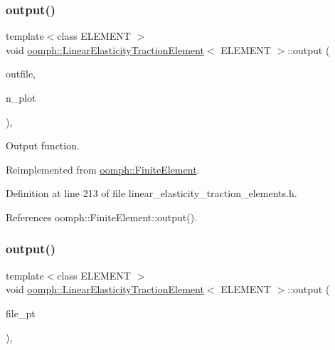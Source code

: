 \subsubsection{\texorpdfstring{output()}{output()}\hspace{0.1cm}{\footnotesize\ttfamily [2/4]}}
{\footnotesize\ttfamily template$<$class E\+L\+E\+M\+E\+NT $>$ \\
void \hyperlink{classoomph_1_1LinearElasticityTractionElement}{oomph\+::\+Linear\+Elasticity\+Traction\+Element}$<$ E\+L\+E\+M\+E\+NT $>$\+::output (\begin{DoxyParamCaption}\item[{std\+::ostream \&}]{outfile,  }\item[{const unsigned \&}]{n\+\_\+plot }\end{DoxyParamCaption})\hspace{0.3cm}{\ttfamily [inline]}, {\ttfamily [virtual]}}



Output function. 



Reimplemented from \hyperlink{classoomph_1_1FiniteElement_afa9d9b2670f999b43e6679c9dd28c457}{oomph\+::\+Finite\+Element}.



Definition at line 213 of file linear\+\_\+elasticity\+\_\+traction\+\_\+elements.\+h.



References oomph\+::\+Finite\+Element\+::output().

\mbox{\label{classoomph_1_1LinearElasticityTractionElement_a6b5134b3460ac380e9cca892d5b4a0a3}} 
\subsubsection{\texorpdfstring{output()}{output()}\hspace{0.1cm}{\footnotesize\ttfamily [3/4]}}
{\footnotesize\ttfamily template$<$class E\+L\+E\+M\+E\+NT $>$ \\
void \hyperlink{classoomph_1_1LinearElasticityTractionElement}{oomph\+::\+Linear\+Elasticity\+Traction\+Element}$<$ E\+L\+E\+M\+E\+NT $>$\+::output (\begin{DoxyParamCaption}\item[{F\+I\+LE $\ast$}]{file\+\_\+pt }\end{DoxyParamCaption})\hspace{0.3cm}{\ttfamily [inline]}, {\ttfamily [virtual]}}



